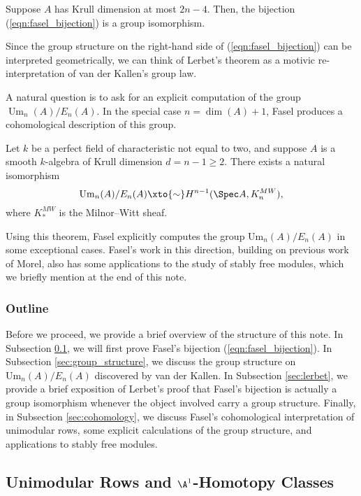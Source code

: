 \begin{theorem}[Lerbet, 2024]
    Suppose $A$ has Krull dimension at most $2n-4$. Then, the bijection (\ref{eqn:fasel_bijection}) is a group isomorphism.
\end{theorem}

Since the group structure on the right-hand side of (\ref{eqn:fasel_bijection}) can be interpreted geometrically, we can think of Lerbet's theorem as a motivic re-interpretation of van der Kallen's group law. 

A natural question is to ask for an explicit computation of the group $\operatorname{Um}_n(A)/E_n(A)$. In the special case $n = \dim(A) + 1$, Fasel \cite{Fasel_2010} produces a cohomological description of this group.

\begin{theorem}[Fasel, 2010]\label{thm:fasel_cohomology}
    Let $k$ be a perfect field of characteristic not equal to two, and suppose $A$ is a smooth $k$-algebra of Krull dimension $d = n-1 \geq 2$. There exists a natural isomorphism 
    \[
    \mathrm{Um}_n(A)/E_n(A) \xto{\sim} H^{n-1}(\Spec A,K_{n}^{MW}),
    \]
    where $K_*^{MW}$ is the Milnor--Witt sheaf.
\end{theorem}

Using this theorem, Fasel explicitly computes the group $\mathrm{Um}_n(A)/E_n(A)$ in some exceptional cases. Fasel's work in this direction, building on previous work of Morel, also has some applications to the study of stably free modules, which we briefly mention at the end of this note.

\subsubsection{Outline} Before we proceed, we provide a brief overview of the structure of this note. In Subsection \ref{sec:fasel}, we will first prove Fasel's bijection (\ref{eqn:fasel_bijection}). In Subsection \ref{sec:group_structure}, we discuss the group structure on $\mathrm{Um}_n(A)/E_n(A)$ discovered by van der Kallen. In Subsection \ref{sec:lerbet}, we provide a brief exposition of Lerbet's proof that Fasel's bijection is actually a group isomorphism whenever the object involved carry a group structure. Finally, in Subsection \ref{sec:cohomology}, we discuss Fasel's cohomological interpretation of unimodular rows, some explicit calculations of the group structure, and applications to stably free modules.  

\subsection{Unimodular Rows and \texorpdfstring{$\A^1$}{A1}-Homotopy Classes}\label{sec:fasel}


